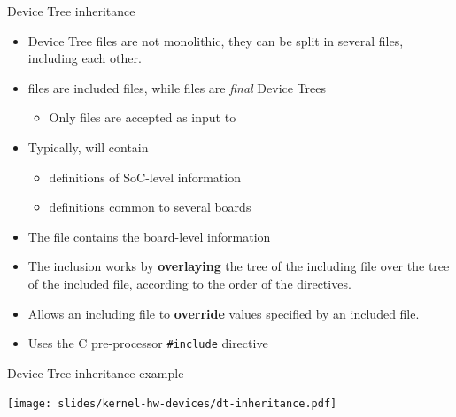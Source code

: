 \begin{frame}[fragile]{Device Tree inheritance}
  \begin{itemize}
  \item Device Tree files are not monolithic, they can be split in
    several files, including each other.
  \item {} files are included files, while  files
    are {\em final} Device Trees
    \begin{itemize}
    \item Only  files are accepted as input to 
    \end{itemize}
  \item Typically,  will contain
    \begin{itemize}
    \item definitions of SoC-level information
    \item definitions common to several boards
    \end{itemize}
  \item The  file contains the board-level information
  \item The inclusion works by {\bf overlaying} the tree of the
    including file over the tree of the included file, according
    to the order of the  directives.
  \item Allows an including file to {\bf override} values specified by
    an included file.
  \item Uses the C pre-processor {\tt \#include} directive
  \end{itemize}
\end{frame}

\begin{frame}{Device Tree inheritance example}
  \begin{center}
    \texttt{[image: slides/kernel-hw-devices/dt-inheritance.pdf]}
  \end{center}
\end{frame}

